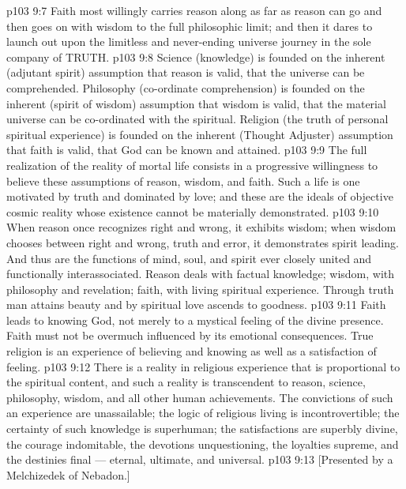 \vs p103 9:7 Faith most willingly carries reason along as far as reason can go and then goes on with wisdom to the full philosophic limit; and then it dares to launch out upon the limitless and never\hyp{}ending universe journey in the sole company of TRUTH.
\vs p103 9:8 \pc Science (knowledge) is founded on the inherent (adjutant spirit) assumption that reason is valid, that the universe can be comprehended. Philosophy (co\hyp{}ordinate comprehension) is founded on the inherent (spirit of wisdom) assumption that wisdom is valid, that the material universe can be co\hyp{}ordinated with the spiritual. Religion (the truth of personal spiritual experience) is founded on the inherent (Thought Adjuster) assumption that faith is valid, that God can be known and attained.
\vs p103 9:9 The full realization of the reality of mortal life consists in a progressive willingness to believe these assumptions of reason, wisdom, and faith. Such a life is one motivated by truth and dominated by love; and these are the ideals of objective cosmic reality whose existence cannot be materially demonstrated.
\vs p103 9:10 When reason once recognizes right and wrong, it exhibits wisdom; when wisdom chooses between right and wrong, truth and error, it demonstrates spirit leading. And thus are the functions of mind, soul, and spirit ever closely united and functionally interassociated. Reason deals with factual knowledge; wisdom, with philosophy and revelation; faith, with living spiritual experience. Through truth man attains beauty and by spiritual love ascends to goodness.
\vs p103 9:11 Faith leads to knowing God, not merely to a mystical feeling of the divine presence. Faith must not be overmuch influenced by its emotional consequences. True religion is an experience of believing and knowing as well as a satisfaction of feeling.
\vs p103 9:12 \pc There is a reality in religious experience that is proportional to the spiritual content, and such a reality is transcendent to reason, science, philosophy, wisdom, and all other human achievements. The convictions of such an experience are unassailable; the logic of religious living is incontrovertible; the certainty of such knowledge is superhuman; the satisfactions are superbly divine, the courage indomitable, the devotions unquestioning, the loyalties supreme, and the destinies final --- eternal, ultimate, and universal.
\vsetoff
\vs p103 9:13 [Presented by a Melchizedek of Nebadon.]
\quizlink
